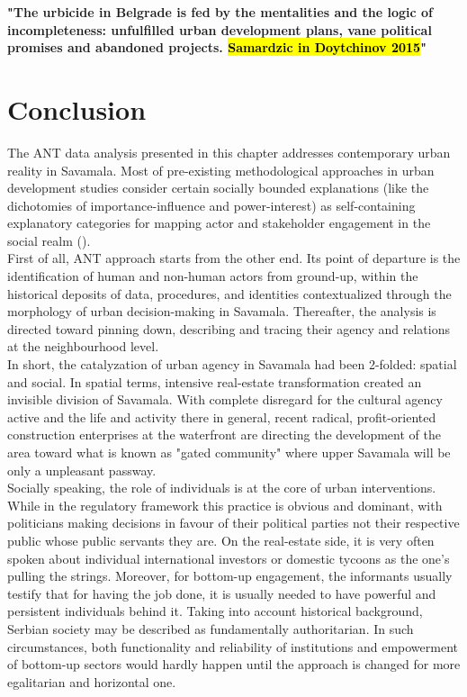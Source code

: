 \documentclass[11pt]{report}
\begin{document}
\textbf{"The  urbicide  in  Belgrade  is  fed  by  the  mentalities and  the  logic  of  incompleteness:  unfulfilled  urban development  plans,  vane  political  promises  and abandoned  projects. \hl{Samardzic in Doytchinov 2015}"}

\section{Conclusion}

The ANT data analysis presented in this chapter addresses contemporary urban reality in Savamala.
Most of pre-existing methodological approaches in urban development studies consider certain socially bounded explanations (like the dichotomies of importance-influence and power-interest) as self-containing explanatory categories for mapping actor and stakeholder engagement in the social realm (\cite{Mathur et al. 2007}).
\\

First of all, ANT approach starts from the other end.
Its point of departure is the identification of human and non-human actors from ground-up, within the historical deposits of data, procedures, and identities contextualized through the morphology of urban decision-making in Savamala.
Thereafter, the analysis is directed toward pinning down, describing and tracing  their agency and relations at the neighbourhood level.
\\

In short, the catalyzation of urban agency in Savamala had been 2-folded: spatial and social.
In spatial terms, intensive real-estate transformation created an invisible division of Savamala. With complete disregard for the cultural agency active and the life and activity there in general, recent radical, profit-oriented construction enterprises at the waterfront are directing the development of the area toward what is known as "gated community" where upper Savamala will be only a unpleasant passway.
\\

Socially speaking, the role of individuals is at the core of urban interventions.
While in the regulatory framework this practice is obvious and dominant, with politicians making decisions in favour of their political parties not their respective public whose public servants they are.
On the real-estate side, it is very often spoken about individual international investors or domestic tycoons as the one's pulling the strings.
Moreover, for bottom-up engagement, the informants usually testify that for having the job done, it is usually needed to have powerful and persistent individuals behind it.
Taking into account historical background, Serbian society may be described as fundamentally authoritarian.
In such circumstances, both functionality and reliability of institutions and empowerment of bottom-up sectors would hardly happen until the approach is changed for more egalitarian and horizontal one. 
\\
\end{document}
